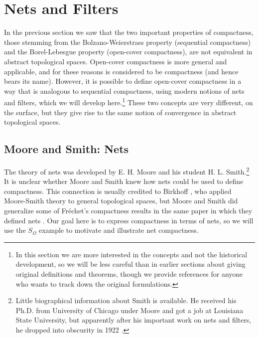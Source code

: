 \documentclass[12pt]{article}
\begin{document}

\section{Nets and Filters}

In the previous section we saw that the two important properties of compactness, those
stemming from the Bolzano-Weierstrass property (sequential compactness) and the Borel-Lebesgue property
(open-cover compactness), are not equivalent in abstract topological spaces. Open-cover compactness is more 
general and applicable, and for these reasons is considered to be compactness (and hence bears its name). However, it is possible to define open-cover compactness in a way that is analogous to sequential compactness, using modern notions of nets and filters, which we will develop here.\footnote{In this section we are more interested in the concepts and not the historical development, so we will be less careful than in earlier sections about giving original definitions and theorems, though we provide references for anyone who wants to track down the original formulations.} These two concepts are very different, on the surface, but they give rise to the same notion of convergence in abstract topological spaces.

\subsection{Moore and Smith: Nets}

The theory of nets was developed by E. H. Moore and his student H. L. Smith.\footnote{Little
biographical information about Smith is available. He received his Ph.D. from University of Chicago under Moore and got a job at Louisiana State University, but apparently after his important work on nets and filters, he dropped into obscurity in 1922 \cite[p. 563]{hal1}.} It is unclear whether Moore and Smith knew how nets could be used to define compactness. This connection is usually credited to Birkhoff  \cite[p. 64]{kell}, who applied Moore-Smith theory to general topological spaces, but Moore and Smith did generalize some of Fr\'{e}chet's compactness results in the same paper in which they defined nets \cite[p. 118]{moor}. Our goal here is to express compactness in terms of nets, so we will use the  
$S_\Omega$ example to motivate and illustrate net compactness.

\end{document}
